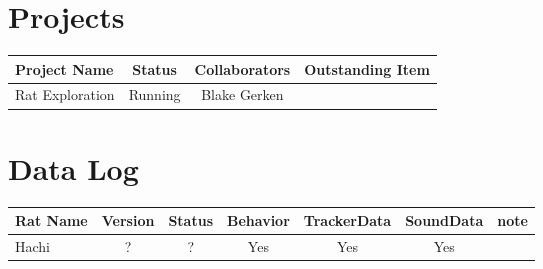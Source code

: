 \documentclass{article}
\begin{document}
\def\arraystretch{2.5}

\section{Projects}
\begin{center}

\begin{tabularx}{\textwidth}{ |l|c|c|X|  }
\hline
Project Name & Status & Collaborators & Outstanding Item\\
\hline
Rat Exploration & Running & Blake Gerken &  \\
\hline
\end{tabularx}
\end{center}
\section{Data Log}
\begin{center}
\begin{tabularx}{\textwidth}{ |l|c|c|c|c|c|X| }
\hline
Rat Name & Version & Status & Behavior & TrackerData & SoundData & note\\
\hline
Hachi & ? & ? & Yes & Yes & Yes & \\
\hline
\end{tabularx}
\end{center}
\end{document}
